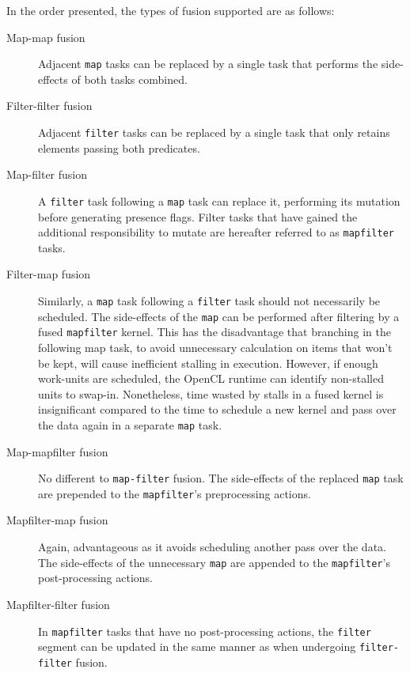 In the order presented, the types of fusion supported are as follows:
\begin{description}
\item[Map-map fusion] Adjacent \verb|map| tasks can be replaced by a single task that performs the side-effects of both tasks combined.

\item[Filter-filter fusion] Adjacent \verb|filter| tasks can be replaced by a single task that only retains elements passing both predicates.

\item[Map-filter fusion] A \verb|filter| task following a \verb|map| task can replace it, performing its mutation before generating presence flags. Filter tasks that have gained the additional responsibility to mutate are hereafter referred to as \verb|mapfilter| tasks.

\item[Filter-map fusion] Similarly, a \verb|map| task following a \verb|filter| task should not necessarily be scheduled. The side-effects of the \verb|map| can be performed after filtering by a fused \verb|mapfilter| kernel. This has the disadvantage that branching in the following map task, to avoid unnecessary calculation on items that won't be kept, will cause inefficient stalling in execution. However, if enough work-units are scheduled, the \ac{OpenCL} runtime can identify non-stalled units to swap-in. Nonetheless, time wasted by stalls in a fused kernel is insignificant compared to the time to schedule a new kernel and pass over the data again in a separate \verb|map| task.

\item[Map-mapfilter fusion] No different to \verb|map-filter| fusion. The side-effects of the replaced \verb|map| task are prepended to the \verb|mapfilter|'s preprocessing actions.

\item[Mapfilter-map fusion] Again, advantageous as it avoids scheduling another pass over the data. The side-effects of the unnecessary \verb|map| are appended to the \verb|mapfilter|'s post-processing actions.

\item[Mapfilter-filter fusion] In \verb|mapfilter| tasks that have no post-processing actions, the \verb|filter| segment can be updated in the same manner as when undergoing \verb|filter-filter| fusion.
\end{description}

